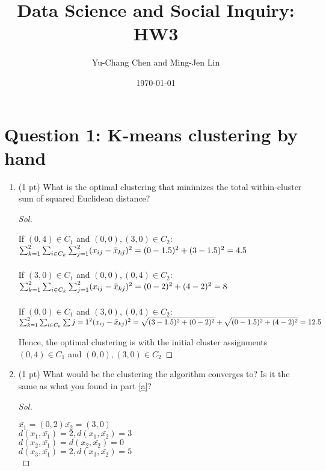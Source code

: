 \documentclass[11pt, oneside]{article}   	%
\title{Data Science and Social Inquiry: HW3}
\author{Yu-Chang Chen and Ming-Jen Lin}
\date{\today}
\newenvironment{Solution}[1][Sol]{%
  \begin{proof}[#1]$ $\par\nobreak\ignorespaces
	\qquad
}{%
  \end{proof}
}
\begin{document}
\maketitle
\section*{Question 1: K-means clustering by hand}

\begin{enumerate}[label = (\emph{\alph*})]
	\item (1 pt) \label{a} What is the optimal clustering that minimizes the
	      total within-cluster sum of squared Euclidean distance?

	      \begin{Solution}
          If $(0,4)\in C_{1}$ and  $(0,0),(3,0)\in C_{2}$:\\
          $\sum_{k=1}^2 \sum_{i\in C_{k}}\sum_{j=1}^2(x_{ij}-\Bar{x}_{kj})^2=(0-1.5)^2+(3-1.5)^2=4.5$\\\\
          If $(3,0)\in C_{1}$ and  $(0,0),(0,4)\in C_{2}$:\\
          $\sum_{k=1}^2 \sum_{i\in C_{k}}\sum_{j=1}^2(x_{ij}-\Bar{x}_{kj})^2=(0-2)^2+(4-2)^2=8$\\\\
          If $(0,0)\in C_{1}$ and  $(3,0),(0,4)\in C_{2}$:\\
          $\sum_{k=1}^2 \sum_{i\in C_{k}}\sum{j=1}^2(x_{ij}-\Bar{x}_{kj})^2=\sqrt{(3-1.5)^2+(0-2)^2}+\sqrt{(0-1.5)^2+(4-2)^2}=12.5$
          
          Hence, the optimal clustering is with the initial cluster assignments$(0,4)\in C_{1}$ and  $(0,0),(3,0)\in C_{2}$
          
	      \end{Solution}
	\item (1 pt)
	      What would be the clustering the algorithm converges to? Is it the
	      same as what you found in part \ref{a}?


	      \begin{Solution}
            
            $\bar{x_{1}}=(0,2)\bar{x_{2}}=(3,0)$\\
            
            $d(x_{1},\bar{x_{1}})=2, d(x_{1},\bar{x_{2}})=3$\\
            $d(x_{2},\bar{x_{1}})=$$ d(x_{2},\bar{x_{2}})=0$\\
            $d(x_{3},\bar{x_{1}})=2, d(x_{3},\bar{x_{2}})=5$\\
            

\end{Solution}
\end{enumerate}
\end{document}
